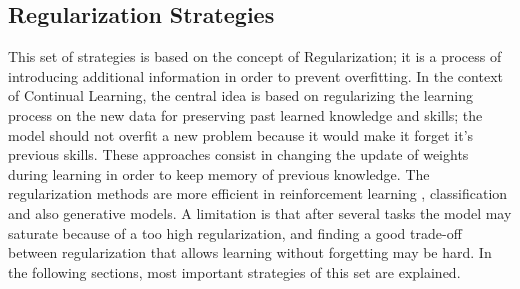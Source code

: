 \documentclass[english, LaM, oneside]{sapthesis}%
\begin{document}
\subsection{Regularization Strategies}
This set of strategies is based on the concept of Regularization; it is a process of introducing additional information in order to prevent overfitting. In the context of Continual Learning, the central idea is based on regularizing the learning process on the new data for preserving past learned knowledge and skills; the model should not overfit a new problem because it would make it forget it’s previous skills. These approaches consist in changing the update of weights during learning in order to keep memory of previous knowledge.
The regularization methods are more efficient in reinforcement learning \cite{Kirkpatrick}, classification \cite{chelsea} and also generative models. A limitation is that after several tasks the model may saturate because of a too high regularization, and finding a good trade-off between regularization that allows learning without forgetting may be hard.
\newline \newline
In the following sections, most important strategies of this set are explained.
\end{document}
